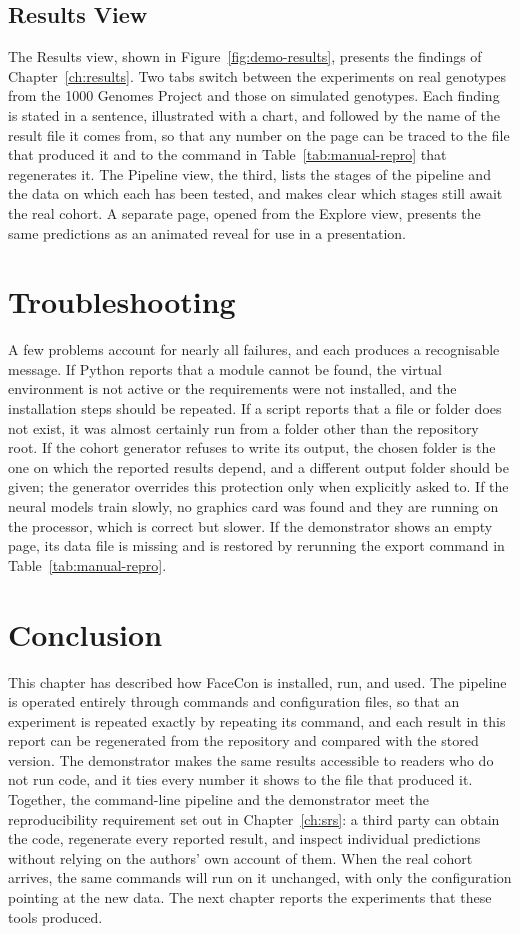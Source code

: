 \subsection{Results View}
The Results view, shown in Figure~\ref{fig:demo-results}, presents the findings of Chapter~\ref{ch:results}. Two tabs switch between the experiments on real genotypes from the 1000 Genomes Project and those on simulated genotypes. Each finding is stated in a sentence, illustrated with a chart, and followed by the name of the result file it comes from, so that any number on the page can be traced to the file that produced it and to the command in Table~\ref{tab:manual-repro} that regenerates it. The Pipeline view, the third, lists the stages of the pipeline and the data on which each has been tested, and makes clear which stages still await the real cohort. A separate page, opened from the Explore view, presents the same predictions as an animated reveal for use in a presentation.

\section{Troubleshooting}
\label{sec:manual-trouble}
A few problems account for nearly all failures, and each produces a recognisable message. If Python reports that a module cannot be found, the virtual environment is not active or the requirements were not installed, and the installation steps should be repeated. If a script reports that a file or folder does not exist, it was almost certainly run from a folder other than the repository root. If the cohort generator refuses to write its output, the chosen folder is the one on which the reported results depend, and a different output folder should be given; the generator overrides this protection only when explicitly asked to. If the neural models train slowly, no graphics card was found and they are running on the processor, which is correct but slower. If the demonstrator shows an empty page, its data file is missing and is restored by rerunning the export command in Table~\ref{tab:manual-repro}.

\section{Conclusion}
This chapter has described how FaceCon is installed, run, and used. The pipeline is operated entirely through commands and configuration files, so that an experiment is repeated exactly by repeating its command, and each result in this report can be regenerated from the repository and compared with the stored version. The demonstrator makes the same results accessible to readers who do not run code, and it ties every number it shows to the file that produced it. Together, the command-line pipeline and the demonstrator meet the reproducibility requirement set out in Chapter~\ref{ch:srs}: a third party can obtain the code, regenerate every reported result, and inspect individual predictions without relying on the authors' own account of them. When the real cohort arrives, the same commands will run on it unchanged, with only the configuration pointing at the new data. The next chapter reports the experiments that these tools produced.
